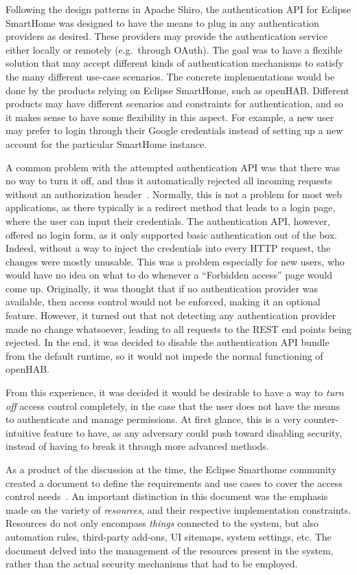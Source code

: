 \documentclass[12pt]{article}
\begin{document}
Following the design patterns in Apache Shiro, the authentication API for Eclipse SmartHome was designed to have the means to plug in any authentication providers as desired. These providers may provide the authentication service either locally or remotely (e.g.\ through OAuth). The goal was to have a flexible solution that may accept different kinds of authentication mechanisms to satisfy the many different use-case scenarios. The concrete implementations would be done by the products relying on Eclipse SmartHome, such as openHAB. Different products may have different scenarios and constraints for authentication, and so it makes sense to have some flexibility in this aspect. For example, a new user may prefer to login through their Google credentials instead of setting up a new account for the particular SmartHome instance. 

A common problem with the attempted authentication API was that there was no way to turn it off, and thus it automatically rejected all incoming requests without an authorization header~\cite{esh_05}. Normally, this is not a problem for most web applications, as there typically is a redirect method that leads to a login page, where the user can input their credentials. The authentication API, however, offered no login form, as it only supported basic authentication out of the box. Indeed, without a way to inject the credentials into every HTTP request, the changes were mostly unusable. This was a problem especially for new users, who would have no idea on what to do whenever a ``Forbidden access'' page would come up. Originally, it was thought that if no authentication provider was available, then access control would not be enforced, making it an optional feature. However, it turned out that not detecting any authentication provider made no change whatsoever, leading to all requests to the REST end points being rejected. In the end, it was decided to disable the authentication API bundle from the default runtime, so it would not impede the normal functioning of openHAB.

From this experience, it was decided it would be desirable to have a way to \emph{turn off} access control completely, in the case that the user does not have the means to authenticate and manage permissions. At first glance, this is a very counter-intuitive feature to have, as any adversary could push toward disabling security, instead of having to break it through more advanced methods. 

As a product of the discussion at the time, the Eclipse Smarthome community created a document to define the requirements and use cases to cover the access control needs~\cite{esh_06}. An important distinction in this document was the emphasis made on the variety of \emph{resources}, and their respective implementation constraints. Resources do not only encompass \emph{things} connected to the system, but also automation rules, third-party add-ons, UI sitemaps, system settings, etc. The document delved into the management of the resources present in the system, rather than the actual security mechanisms that had to be employed. 
\end{document}
